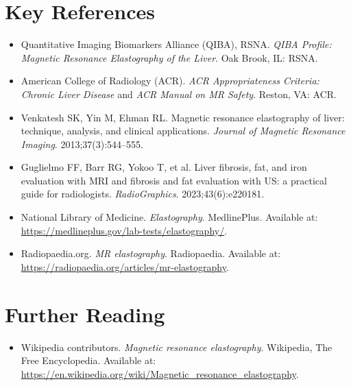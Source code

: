 \section{Key References}
\begin{itemize}
\item Quantitative Imaging Biomarkers Alliance (QIBA), RSNA. \textit{QIBA Profile: Magnetic Resonance Elastography of the Liver}. Oak Brook, IL: RSNA.
\item American College of Radiology (ACR). \textit{ACR Appropriateness Criteria: Chronic Liver Disease} and \textit{ACR Manual on MR Safety}. Reston, VA: ACR.
\item Venkatesh SK, Yin M, Ehman RL. Magnetic resonance elastography of liver: technique, analysis, and clinical applications. \textit{Journal of Magnetic Resonance Imaging}. 2013;37(3):544--555.
\item Guglielmo FF, Barr RG, Yokoo T, et al. Liver fibrosis, fat, and iron evaluation with MRI and fibrosis and fat evaluation with US: a practical guide for radiologists. \textit{RadioGraphics}. 2023;43(6):e220181.
\item National Library of Medicine. \textit{Elastography}. MedlinePlus. Available at: \url{https://medlineplus.gov/lab-tests/elastography/}.
\item Radiopaedia.org. \textit{MR elastography}. Radiopaedia. Available at: \url{https://radiopaedia.org/articles/mr-elastography}.
\end{itemize}

\section{Further Reading}
\begin{itemize}
  \item Wikipedia contributors. \textit{Magnetic resonance elastography}. Wikipedia, The Free Encyclopedia. Available at: \url{https://en.wikipedia.org/wiki/Magnetic_resonance_elastography}.
\end{itemize}
